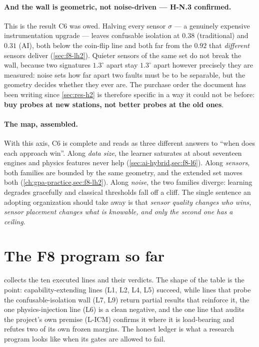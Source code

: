\paragraph{And the wall is geometric, not noise-driven --- H-N.3 confirmed.} This is the
result C6 was owed. Halving every sensor $\sigma$ --- a genuinely expensive instrumentation
upgrade --- leaves confusable isolation at $0.38$ (traditional) and $0.31$ (AI), both below
the coin-flip line and both far from the $0.92$ that \emph{different} sensors deliver
(\cref{sec:f8-lh2}). Quieter sensors of the same set do not break the wall, because two
signatures $1.3^{\circ}$ apart stay $1.3^{\circ}$ apart however precisely they are measured:
noise sets how far apart two faults must be to be separable, but the geometry decides whether
they ever are. The purchase order the document has been writing since \cref{sec:res-h2} is
therefore specific in a way it could not be before: \textbf{buy probes at new stations, not
better probes at the old ones}.

\paragraph{The map, assembled.} With this axis, C6 is complete and reads as three different
answers to ``when does each approach win''. Along \emph{data size}, the learner saturates at
about seventeen engines and physics features never help (\cref{sec:ai-hybrid,sec:f8-l6}).
Along \emph{sensors}, both families are bounded by the same geometry, and the extended set
moves both (\cref{ch:gpa-practice,sec:f8-lh2}). Along \emph{noise}, the two families diverge:
learning degrades gracefully and classical thresholds fall off a cliff. The single sentence an
adopting organization should take away is that \emph{sensor quality changes who wins, sensor
placement changes what is knowable, and only the second one has a ceiling}.

\section{The F8 program so far}
\label{sec:f8-summary}

 collects the ten executed lines and their verdicts. The shape of the
table is the point: capability-extending lines (L1, L2, L4, L5) succeed, while lines that
probe the confusable-isolation wall (L7, L9) return partial results that reinforce it, the
one physics-injection line (L6) is a clean negative, and the one line that audits the
project's own premise (L-ICM) confirms it where it is load-bearing and refutes two of its
own frozen margins. The honest ledger is what a research program looks like when its gates
are allowed to fail.

